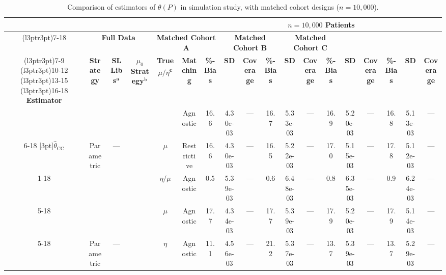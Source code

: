 \begin{table}\tiny

\caption{\label{tab:sim_results_matching}Comparison of estimators of $\theta(P)$ in simulation study, with matched cohort designs ($n = 10,000$).}
\centering
\begin{tabular}[t]{ccccccc@{}c@{}cc@{}c@{}cc@{}c@{}cc@{}c@{}c}
\toprule
\multicolumn{6}{c}{\textbf{ }} & \multicolumn{12}{c}{\textbf{$n = 10,000$ Patients}} \\
\cmidrule(l{3pt}r{3pt}){7-18}
\multicolumn{6}{c}{\textbf{ }} & \multicolumn{3}{c}{\textbf{Full Data}} & \multicolumn{3}{c}{\textbf{Matched Cohort A}} & \multicolumn{3}{c}{\textbf{Matched Cohort B}} & \multicolumn{3}{c}{\textbf{Matched Cohort C}} \\
\cmidrule(l{3pt}r{3pt}){7-9} \cmidrule(l{3pt}r{3pt}){10-12} \cmidrule(l{3pt}r{3pt}){13-15} \cmidrule(l{3pt}r{3pt}){16-18}
\textbf{Estimator} & \textbf{Strategy} & \textbf{SL Libs$\textsuperscript{a}$} & \textbf{$\mu_0$ Strategy$\textsuperscript{b}$} & \textbf{True $\mu/\eta$\textsuperscript{c}} & \textbf{Matching} & \textbf{\%-Bias} & \textbf{SD} & \textbf{Coverage} & \textbf{\%-Bias} & \textbf{SD} & \textbf{Coverage} & \textbf{\%-Bias} & \textbf{SD} & \textbf{Coverage} & \textbf{\%-Bias} & \textbf{SD} & \textbf{Coverage}\\
\midrule
 &  &  &  &  &  Agnostic & 16.6 & 4.30e-03 & --- & 16.7 & 5.33e-03 & --- & 16.9 & 5.20e-03 & --- & 16.8 & 5.13e-03 & ---\\
\cmidrule{6-18}
\multirow{-2}{*}[3pt]{\centering\arraybackslash $\widehat\theta_\text{CC}$} & \multirow{-2}{*}[3pt]{\centering\arraybackslash  Parametric} & \multirow{-2}{*}[3pt]{\centering\arraybackslash ---} & \multirow{-2}{*}[3pt]{\centering\arraybackslash  1} & \multirow{-2}{*}[3pt]{\centering\arraybackslash  $\mu$} &  Restrictive & 16.6 & 4.30e-03 & --- & 16.5 & 5.22e-03 & --- & 17.0 & 5.15e-03 & --- & 17.8 & 5.12e-03 & ---\\
\cmidrule{1-18}
 &  &  &  &  $\eta/\mu$ &  Agnostic & 0.5 & 5.39e-03 & --- & 0.6 & 6.48e-03 & --- & 0.8 & 6.35e-03 & --- & 0.9 & 6.24e-03 & ---\\
\cmidrule{5-18}
 &  &  &  &  $\mu$ &  Agnostic & 17.7 & 4.34e-03 & --- & 17.7 & 5.39e-03 & --- & 17.9 & 5.20e-03 & --- & 17.9 & 5.14e-03 & ---\\
\cmidrule{5-18}
 & \multirow{-3}{*}[5pt]{\centering\arraybackslash  Parametric} & \multirow{-3}{*}[5pt]{\centering\arraybackslash ---} & \multirow{-3}{*}[5pt]{\centering\arraybackslash  1} &  $\eta$ &  Agnostic & 11.1 & 4.56e-03 & --- & 21.2 & 5.37e-03 & --- & 13.7 & 5.39e-03 & --- & 13.7 & 5.29e-03 & ---\\

\end{tabular}
\end{table}
